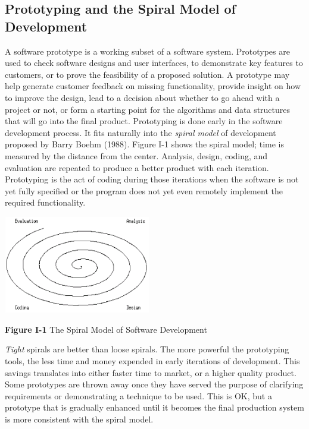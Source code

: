 \subsection{Prototyping and the Spiral Model of Development}
A software prototype is a working subset of a software
system. Prototypes are used to check software designs and user
interfaces, to demonstrate key features to customers, or to prove the
feasibility of a proposed solution. A prototype may help generate
customer feedback on missing functionality, provide insight on how to
improve the design, lead to a decision about whether to go ahead with a
project or not, or form a starting point for the algorithms and data
structures that will go into the final product. Prototyping is done
early in the software development process. It fits naturally into the
\textit{spiral model} of development proposed by
Barry Boehm (1988). Figure I-1 shows the spiral
model; time is measured by the distance from the center. Analysis,
design, coding, and evaluation are repeated to produce a better product
with each iteration. {\textquotedbl}Prototyping{\textquotedbl} is the
act of coding during those iterations when the software is not yet
fully specified or the program does not yet even remotely implement the
required functionality.



\begin{center}
\includegraphics[width=2.5402in,height=1.6799in]{ub-img/ub-img4.png}
\end{center}

{\sffamily\bfseries Figure I-1}
{\sffamily The Spiral Model of Software Development}

\bigskip

\textit{Tight} spirals are better than loose spirals. The more powerful
the prototyping tools, the less time and money expended in early
iterations of development. This savings translates into either faster
time to market, or a higher quality product. Some prototypes are thrown
away once they have served the purpose of clarifying requirements or
demonstrating a technique to be used. This is OK, but a prototype that
is gradually enhanced until it becomes the final production system is
more consistent with the spiral model.


